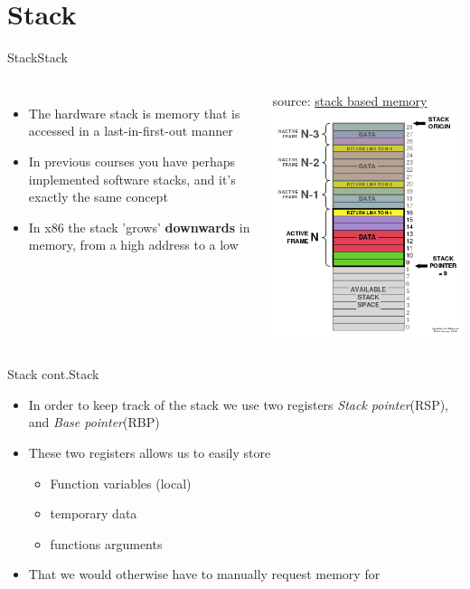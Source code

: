 \documentclass[
	11pt, %
	aspectratio=169, %
]{beamer}
\begin{document}
\section{Stack}
\def \sectiontitle{Stack}
\begin{frame}{Stack}{\sectiontitle}
    \begin{columns}
        \begin{itemize}
            \item The hardware stack is memory that is accessed in a last-in-first-out manner
            \item In previous courses you have perhaps implemented software stacks, and it's exactly the same concept
            \item In x86 the stack 'grows' \textbf{downwards} in memory, from a high address to a low
        \end{itemize}

        source: \href{https://en.wikipedia.org/wiki/Stack-based_memory_allocation}{stack based memory}
        \includegraphics[scale=0.5]{./images/stack.png}
    \end{columns}
\end{frame}

\begin{frame}{Stack cont.}{\sectiontitle}
    \begin{itemize}
        \item In order to keep track of the stack we use two registers \textit{Stack pointer}(RSP), and \textit{Base pointer}(RBP)
        \item These two registers allows us to easily store
              \begin{itemize}
                  \item Function variables (local)
                  \item temporary data
                  \item functions arguments
              \end{itemize}
        \item That we would otherwise have to manually request memory for
    \end{itemize}
\end{frame}
\end{document}
